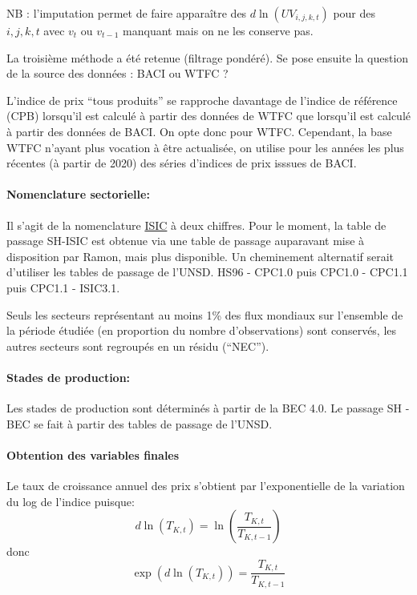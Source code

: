 \documentclass[12pt]{article}
\begin{document}
NB : l'imputation permet de faire apparaître des $d\ln(UV_{i,j,k,t})$ pour des $i,j,k,t$ avec $v_t$ ou $v_{t-1}$ manquant mais on ne les conserve pas.

La troisième méthode a été retenue (filtrage pondéré). Se pose ensuite la question de la source des données : BACI ou WTFC ? 

L'indice de prix ``tous produits'' se rapproche davantage de l'indice de référence (CPB) lorsqu'il est calculé à partir des données de WTFC que lorsqu'il est calculé à partir des données de BACI. On opte donc pour WTFC. Cependant, la base WTFC n'ayant plus vocation à être actualisée, on utilise pour les années les plus récentes (à partir de 2020) des séries d'indices de prix isssues de BACI.

\paragraph{Nomenclature sectorielle:} 

Il s'agit de la nomenclature \href{https://unstats.un.org/unsd/classifications/Econ}{ISIC} à deux chiffres. Pour le moment, la table de passage SH-ISIC est obtenue via une table de passage auparavant mise à disposition par Ramon, mais plus disponible. Un cheminement alternatif serait d'utiliser les tables de passage de l'UNSD. HS96 - CPC1.0 puis CPC1.0 - CPC1.1 puis CPC1.1 - ISIC3.1.

Seuls les secteurs représentant au moins 1\% des flux mondiaux sur l'ensemble de la période étudiée (en proportion du nombre d'observations) sont conservés, les autres secteurs sont regroupés en un résidu (``NEC'').

\paragraph{Stades de production:}

Les stades de production sont déterminés à partir de la BEC 4.0. Le passage SH - BEC se fait à partir des tables de passage de l'UNSD. 

\paragraph{Obtention des variables finales}

Le taux de croissance annuel des prix s'obtient par l'exponentielle de la variation du log de l'indice puisque:
$$ d\ln(T_{K,t}) = \ln \left( \frac{T_{K,t}}{T_{K,t-1}} \right) $$
donc 
$$ \exp(d\ln(T_{K,t})) = \frac{T_{K,t}}{T_{K,t-1}}$$
  
\end{document}
